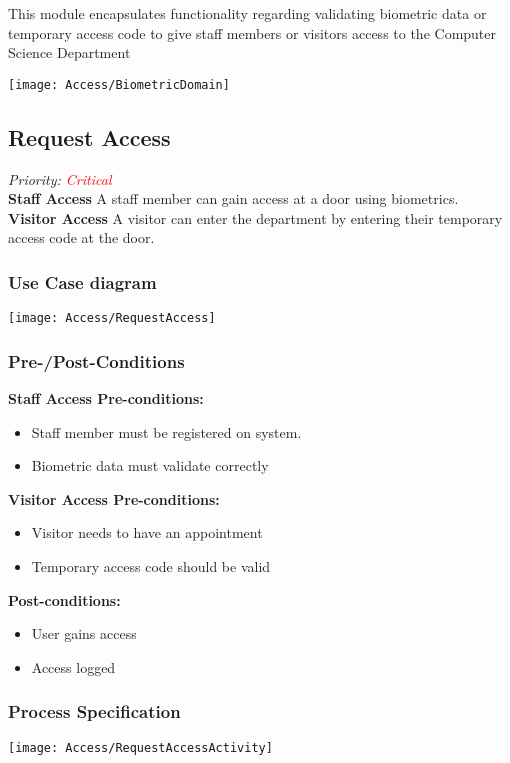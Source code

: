
This module encapsulates functionality regarding validating biometric data or temporary access code to give staff members or visitors access to the Computer Science Department

\texttt{[image: Access/BiometricDomain]}

\subsection{Request Access}
\textit{ Priority: \textcolor{red}{Critical}} \\


\textbf{Staff Access} A staff member can gain access at a door using biometrics. \\
\textbf{Visitor Access} A visitor can enter the department by entering their temporary access code at the door.

\subsubsection{Use Case diagram}
\texttt{[image: Access/RequestAccess]}

\subsubsection{Pre-/Post-Conditions}
\textbf{Staff Access Pre-conditions:} 
	\begin{itemize}
		\item Staff member must be registered on system.
		\item Biometric data must validate correctly
	\end{itemize}
\textbf{Visitor Access Pre-conditions:} 
	\begin{itemize}
		\item Visitor needs to have an appointment
		\item Temporary access code should be valid
	\end{itemize}
\textbf{ Post-conditions:} 
	\begin{itemize}
		\item User gains access
		\item Access logged
	\end{itemize}
	
\subsubsection{Process Specification}
	\texttt{[image: Access/RequestAccessActivity]}	

